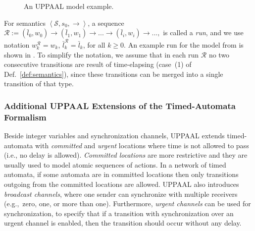 \begin{figure}[!t]
\centering
\caption{An UPPAAL model example.}
\label{fig:upp_ex}
\end{figure} 



For semantics $\left<\mathcal{S},s_0,\rightarrow\right>$, a sequence $\mathcal{R}:=(\bar{l}_0,w_0)\rightarrow(\bar{l}_1,w_1)\rightarrow...\rightarrow(\bar{l}_i,w_i)\rightarrow...,$ 
is called a \textit{run}, and we use notation $w_k^\mathcal{R}=w_k$, $\bar{l}_k^\mathcal{R}=\bar{l}_k$, for all $k\geq 0$. An example run for the model from  is shown in . To simplify the notation, we assume that in each run $\mathcal{R}$ no two consecutive transitions are result of time-elapsing (case~(1) of Def.~\ref{def:semantics}), since these transitions can be merged into a single transition of that type. 


\subsubsection{Additional UPPAAL Extensions of the Timed-Automata Formalism}
Beside integer variables and synchronization channels, UPPAAL extends timed-automata with \textit{committed} and \textit{urgent} locations where time is not allowed to pass (i.e., no delay is allowed). 
\textit{Committed locations} are more restrictive and they are usually used to model atomic sequences of actions. In a network of timed automata, if some automata are in committed locations then only transitions outgoing from the committed locations are allowed. UPPAAL also introduces \textit{broadcast channels}, where one sender can synchronize with multiple receivers (e.g.,~zero, one, or more than one). Furthermore, \textit{urgent channels} can be used for synchronization, to specify that if a transition with synchronization over an urgent channel is enabled, then the transition should occur without any delay. 




